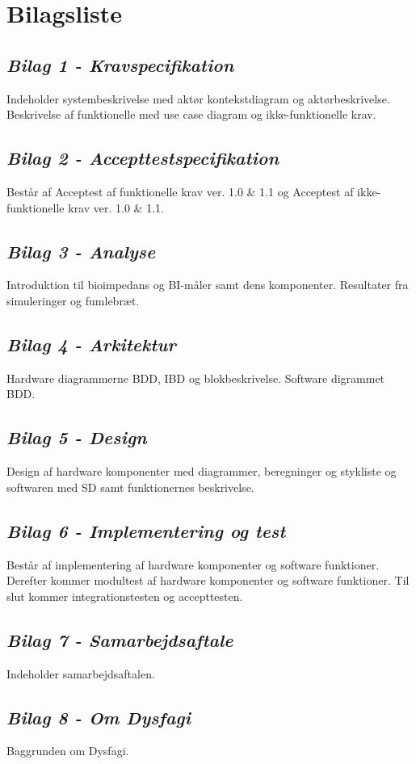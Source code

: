 \chapter{Bilagsliste}
\section*{\textit{Bilag 1 - Kravspecifikation}} \label{bilag1}
Indeholder systembeskrivelse med aktør kontekstdiagram og aktørbeskrivelse. Beskrivelse af funktionelle med use case diagram og ikke-funktionelle krav.
\section*{\textit{Bilag 2 - Accepttestspecifikation}} \label{bilag2}
Består af Acceptest af funktionelle krav ver. 1.0 \& 1.1 og Acceptest af ikke-funktionelle krav ver. 1.0 \& 1.1.
\section*{\textit{Bilag 3 - Analyse}} \label{bilag3}
Introduktion til bioimpedans og BI-måler samt dens komponenter. Resultater fra simuleringer og fumlebræt.
\section*{\textit{Bilag 4 - Arkitektur}} \label{bilag4}
Hardware diagrammerne BDD, IBD og blokbeskrivelse. Software digrammet BDD.
\section*{\textit{Bilag 5 - Design}} \label{bilag5}
Design af hardware komponenter med diagrammer, beregninger og stykliste og softwaren med SD samt funktionernes beskrivelse.
\section*{\textit{Bilag 6 - Implementering og test}} \label{bilag6}
Består af implementering af hardware komponenter og software funktioner. Derefter kommer modultest af hardware komponenter og software funktioner. Til slut kommer integrationstesten og accepttesten.
\section*{\textit{Bilag 7 - Samarbejdsaftale}} \label{bilag7}
Indeholder samarbejdsaftalen.
\section*{\textit{Bilag 8 - Om Dysfagi}} \label{bilag8}
Baggrunden om Dysfagi.
